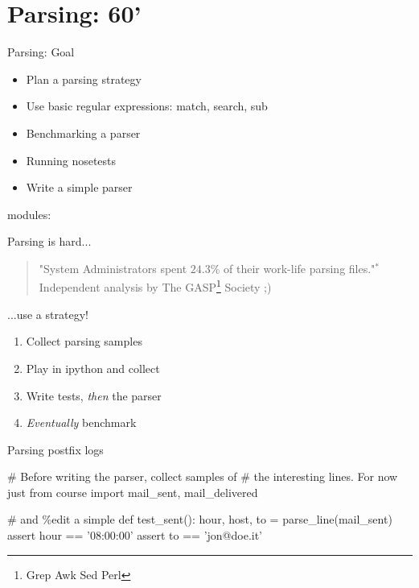 \section{Parsing: 60'}

\begin{pyframe}{Parsing: Goal}
\begin{itemize}
\item Plan a parsing strategy
\item Use basic regular expressions: match, search, sub
\item Benchmarking a parser
\item Running nosetests
\item Write a simple parser
\end{itemize}
modules: 
\end{pyframe}


\begin{pyframe}{Parsing is hard...}
\begin{verse}
"System Administrators spent $24.3\%$ of
 their work-life parsing files."$^{*}$\\
\hfill *Independent analysis by The GASP\footnote{Grep Awk Sed Perl} Society ;)
\end{verse}
\end{pyframe}


\begin{pyframe}{...use a strategy!}
\begin{enumerate}
\Large
\item Collect parsing samples
\item Play in ipython and collect 
\item Write tests, \emph{then} the parser
\item \emph{Eventually} benchmark
\end{enumerate}
\end{pyframe}



\begin{pyframe}{Parsing postfix logs}
\begin{pycode}
# Before writing the parser, collect samples of
#  the interesting lines. For now just 
from course import mail_sent, mail_delivered

# and \%edit a simple 
def test_sent():
    hour, host, to = parse_line(mail_sent)
    assert hour == '08:00:00'
    assert to == 'jon@doe.it'

\end{pycode}
\end{pyframe}


